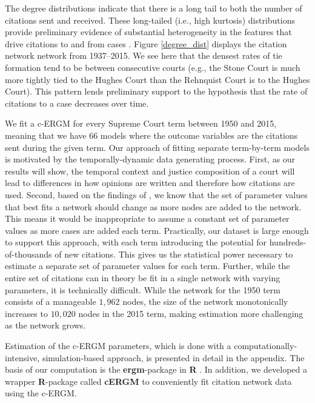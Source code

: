 \documentclass{cup-pan}
\begin{document}
The degree distributions indicate that there is a long tail to both the number of citations sent and received. These long-tailed (i.e., high kurtosis) distributions provide preliminary evidence of substantial heterogeneity in the features that drive citations to and from cases \citep{strogatz2001exploring}. Figure \ref{degree_dist} displays the citation network network from 1937--2015. We see here that the densest rates of tie formation tend to be between consecutive courts (e.g., the Stone Court is much more tightly tied to the Hughes Court than the Rehnquist Court is to the Hughes Court). This pattern lends preliminary support to the hypothesis that the rate of citations to a case decreases over time.



We fit a c-ERGM for every Supreme Court term between 1950 and 2015, meaning that we have 66 models where the outcome variables are the citations sent during the given term. Our approach of fitting separate term-by-term models is motivated by the temporally-dynamic data generating process. First, as our results will show, the temporal context and justice composition of a court will lead to differences in how opinions are written and therefore how citations are used. Second, based on the findings of \citet{shalizi2013consistency}, we know that the set of parameter values that best fits a network should change as more nodes are added to the network. This means it would be inappropriate to assume a constant set of parameter values as more cases are added each term. Practically, our dataset is large enough to support this approach, with each term introducing the potential for hundreds-of-thousands of new citations. This gives us the statistical power necessary to estimate a separate set of parameter values for each term. Further, while the entire set of citations can in theory be fit in a single network with varying parameters, it is technically difficult. While the network for the 1950 term consists of a manageable $1,962$ nodes, the size of the network monotonically increases to $10,020$ nodes in the 2015 term, making estimation more challenging as the network grows. 

Estimation of the c-ERGM parameters, which is done with a computationally-intensive, simulation-based approach, is presented in detail in the appendix. The basis of our computation is the \textbf{ergm}-package \citep{HunterDavidR..2008} in \textbf{R} \citep{RCore}. In addition, we developed a wrapper \textbf{R}-package called \textbf{cERGM} \citep{cergm} to conveniently fit citation network data using the c-ERGM.
\end{document}
